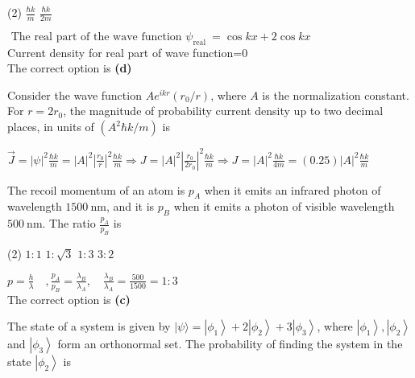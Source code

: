 \begin{enumerate}
	\begin{tasks}(2)
		\task[\textbf{B.}]$\frac{\hbar k}{m}$
		\task[\textbf{C.}]$\frac{\hbar k}{2 m}$
	\end{tasks}
	\begin{answer}
		$\text { The real part of the wave function } \psi_{\text {real }}=\cos k x+2 \cos k x$\\
		Current density for real part of wave function=0\\
		The correct option is \textbf{(d)}	
	\end{answer}
	\begin{minipage}{\textwidth}
		\item Consider the wave function $A e^{i k r}\left(r_{0} / r\right)$, where $A$ is the normalization constant.
		For $r=2 r_{0}$, the magnitude of probability current density up to two decimal places, in units of $\left(A^{2} \hbar k / m\right)$ is
	\end{minipage}
	\begin{answer}
		$\vec{J}=|\psi|^{2} \frac{\hbar k}{m}=|A|^{2}\left|\frac{r_{0}}{r}\right|^{2} \frac{\hbar k}{m} \Rightarrow J=|A|^{2}\left|\frac{r_{0}}{2 r_{0}}\right|^{2} \frac{\hbar k}{m} \Rightarrow J=|A|^{2} \frac{\hbar k}{4 m}=(0.25)|A|^{2} \frac{\hbar k}{m}$
	\end{answer}
	\begin{minipage}{\textwidth}
		\item The recoil momentum of an atom is $p_{A}$ when it emits an infrared photon of wavelength $1500 \mathrm{~nm}$, and it is $p_{B}$ when it emits a photon of visible wavelength $500 \mathrm{~nm}$. The ratio $\frac{p_{A}}{p_{B}}$ is
	\end{minipage}
	\begin{tasks}(2)
		\task[\textbf{A.}] $1: 1$
		\task[\textbf{B.}]$1: \sqrt{3}$
		\task[\textbf{C.}]$1: 3$
		\task[\textbf{D.}] $3: 2$
	\end{tasks}
	\begin{answer}
		$p=\frac{h}{\lambda} \quad, \frac{p_{A}}{p_{B}}=\frac{\lambda_{B}}{\lambda_{A}}, \quad \frac{\lambda_{B}}{\lambda_{A}}=\frac{500}{1500}=1: 3$\\
		The correct option is \textbf{(c)}
	\end{answer}
	\begin{minipage}{\textwidth}
		\item The state of a system is given by $|\psi\rangle=\left|\phi_{1}\right\rangle+2\left|\phi_{2}\right\rangle+3\left|\phi_{3}\right\rangle$, where $\left|\phi_{1}\right\rangle,\left|\phi_{2}\right\rangle$ and $\left|\phi_{3}\right\rangle$ form an orthonormal set. The probability of finding the system in the state $\left|\phi_{2}\right\rangle$ is

\end{minipage}
\end{enumerate}
